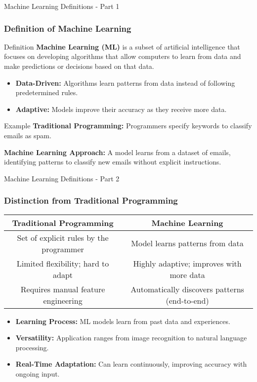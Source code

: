 \documentclass[aspectratio=169]{beamer}
\begin{document}
\begin{frame}[fragile]{Machine Learning Definitions - Part 1}
  \frametitle{Definition of Machine Learning}
  \begin{block}{Definition}
    \textbf{Machine Learning (ML)} is a subset of artificial intelligence that focuses on developing algorithms that allow computers to learn from data and make predictions or decisions based on that data. 
  \end{block}
  
  \begin{itemize}
    \item \textbf{Data-Driven:} Algorithms learn patterns from data instead of following predetermined rules.
    \item \textbf{Adaptive:} Models improve their accuracy as they receive more data.
  \end{itemize}
  
  \begin{block}{Example}
    \textbf{Traditional Programming:} 
    Programmers specify keywords to classify emails as spam.
    
    \textbf{Machine Learning Approach:} 
    A model learns from a dataset of emails, identifying patterns to classify new emails without explicit instructions.
  \end{block}
\end{frame}

\begin{frame}[fragile]{Machine Learning Definitions - Part 2}
  \frametitle{Distinction from Traditional Programming}
  \begin{center}
    \begin{tabular}{|c|c|}
      \hline
      \textbf{Traditional Programming} & \textbf{Machine Learning} \\
      \hline
      Set of explicit rules by the programmer & Model learns patterns from data \\
      \hline
      Limited flexibility; hard to adapt & Highly adaptive; improves with more data \\
      \hline
      Requires manual feature engineering & Automatically discovers patterns (end-to-end) \\
      \hline
    \end{tabular}
  \end{center}
  
  \begin{itemize}
    \item \textbf{Learning Process:} ML models learn from past data and experiences.
    \item \textbf{Versatility:} Application ranges from image recognition to natural language processing.
    \item \textbf{Real-Time Adaptation:} Can learn continuously, improving accuracy with ongoing input.
  \end{itemize}
\end{frame}
\end{document}
